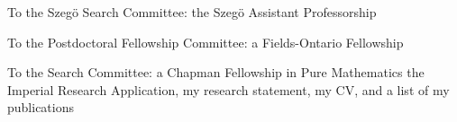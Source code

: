 \documentclass[11pt]{letter}
\begin{document}
\coverletter
  {\stanford}
  {To the Szeg\"o Search Committee:}
  {the Szeg\"o Assistant Professorship}
  {\mathjobs}
  {}
  {}
  {\generic}

\coverletter
  {\fields}
  {To the Postdoctoral Fellowship Committee:}
  {a Fields-Ontario Fellowship}
  {\mathjobs}
  {}
  {}
  {\noteaching}

\coverletter
	{\imperial}
	{To the Search Committee:}
	{a Chapman Fellowship in Pure Mathematics}
	{\website}
	{}
	{}
	{the Imperial Research Application, my research statement, my CV, and a list of my publications}	

%
%
%
%
%
%
%
\end{document}
